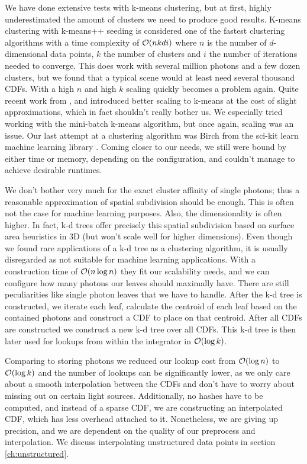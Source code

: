 We have done extensive tests with k-means clustering, but at first, highly underestimated the amount of clusters we need to produce good results. K-means clustering with k-means++ seeding \parencite{DBLP:conf/soda/ArthurV07} is considered one of the fastest clustering algorithms with a time complexity of $\mathcal{O}(nkdi)$ where $n$ is the number of $d$-dimensional data points, $k$ the number of clusters and $i$ the number of iterations needed to converge. This does work with several million photons and a few dozen clusters, but we found that a typical scene would at least need several thousand CDFs. With a high $n$ and high $k$ scaling quickly becomes a problem again. Quite recent work from \textcite{DBLP:conf/kse/HieuM14}, \textcite{DBLP:journals/tpds/XuQLMLL14} and \textcite{DBLP:conf/www/Sculley10} introduced better scaling to k-means at the cost of slight approximations, which in fact shouldn't really bother us. We especially tried working with the mini-batch k-means algorithm, but once again, scaling was an issue. Our last attempt at a clustering algorithm was Birch \parencite{DBLP:conf/sigmod/ZhangRL96} from the sci-kit learn machine learning library \parencite{scikit-learn}. Coming closer to our needs, we still were bound by either time or memory, depending on the configuration, and couldn't manage to achieve desirable runtimes.

We don't bother very much for the exact cluster affinity of single photons; thus a reasonable approximation of spatial subdivision should be enough. This is often not the case for machine learning purposes. Also, the dimensionality is often higher. In fact, k-d trees offer precisely this spatial subdivision based on surface area heuristics in 3D (but won't scale well for higher dimensions). Even though we found rare applications of a k-d tree as a clustering algorithm, it is usually disregarded as not suitable for machine learning applications. With a construction time of $\mathcal{O}(n \log n)$ they fit our scalability needs, and we can configure how many photons our leaves should maximally have. There are still peculiarities like single photon leaves that we have to handle. After the k-d tree is constructed, we iterate each leaf, calculate the centroid of each leaf based on the contained photons and construct a CDF to place on that centroid. After all CDFs are constructed we construct a new k-d tree over all CDFs. This k-d tree is then later used for lookups from within the integrator in $\mathcal{O}(\log k)$.

Comparing to storing photons we reduced our lookup cost from $\mathcal{O}(\log n)$ to $\mathcal{O}(\log k)$ and the number of lookups can be significantly lower, as we only care about a smooth interpolation between the CDFs and don't have to worry about missing out on certain light sources. Additionally, no hashes have to be computed, and instead of a sparse CDF, we are constructing an interpolated CDF, which has less overhead attached to it. Nonetheless, we are giving up precision, and we are dependent on the quality of our preprocess and interpolation. We discuss interpolating unstructured data points in section \ref{ch:unstructured}.

